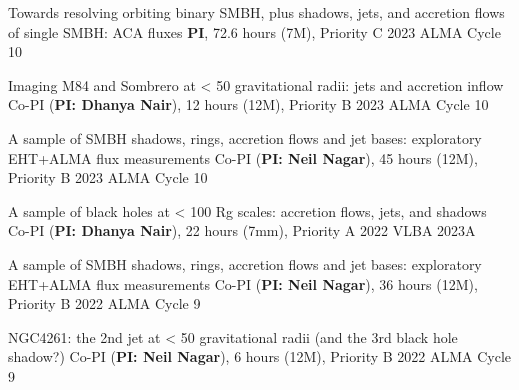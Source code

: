 
\begin{cvpublications}{}
\iffalse
	 \cvpublication{11}
	 {Towards resolving binary SMBH, and jets+accretion flows
in single SMBH: exploratory EHT+ALMA flux measurements}
	 {Co-PI (\textbf{PI: Neil Nagar}), Submitted}
	 {2024}
     {ALMA Cycle 11}
     {}

	 \cvpublication{10}
	 {Towards resolving orbiting binary SMBH, plus shadows, jets, and accretion flows of single SMBH}
	 {Co-PI (\textbf{PI: Neil Nagar}), Submitted}
	 {2024}
     {ALMA Cycle 11}
     {}

	 \cvpublication{9}
	 {Imaging M84 at < 50 gravitational radii: jets and accretion inflow (Resubmission)}
	 {Co-PI (\textbf{PI: Neil Nagar}), Submitted}
	 {2024}
     {ALMA Cycle 11}
     {}

	 \cvpublication{8}
	 {Jet Launching and Black Hole Demographics: the `Gold Sample'}
	 {Co-PI (\textbf{PI: Neil Nagar}), Submitted}
	 {2024}
     {ALMA Cycle 11}
     {}

	 \cvpublication{7}
	 {Six black holes at < 50 Gravitational radii: jet and accretion inflow demographics}
	 {Co-PI (\textbf{PI: Neil Nagar}), Submitted}
	 {2024}
     {ALMA Cycle 11}
     {}
\fi

	 {Towards resolving orbiting binary SMBH, plus shadows, jets, and accretion flows of single SMBH: ACA fluxes}
	 {\textbf{PI}, 72.6 hours (7M), Priority C}
	 {2023}
     {ALMA Cycle 10}
     {}

	 {Imaging M84 and Sombrero at < 50 gravitational radii: jets and accretion inflow}
	 {Co-PI (\textbf{PI: Dhanya Nair}), 12 hours (12M), Priority B}
	 {2023}
     {ALMA Cycle 10}
     {}

	 {A sample of SMBH shadows, rings, accretion flows and jet bases: exploratory EHT+ALMA flux measurements}
	 {Co-PI (\textbf{PI: Neil Nagar}), 45 hours (12M), Priority B}
	 {2023}
     {ALMA Cycle 10}
     {}

	 {A sample of black holes at < 100 Rg scales: accretion flows, jets, and shadows}
	 {Co-PI (\textbf{PI: Dhanya Nair}), 22 hours (7mm), Priority A}
	 {2022}
     {VLBA 2023A}
     {}

	 {A sample of SMBH shadows, rings, accretion flows and jet bases: exploratory EHT+ALMA flux measurements}
	 {Co-PI (\textbf{PI: Neil Nagar}), 36 hours (12M), Priority B}
	 {2022}
     {ALMA Cycle 9}
     {}

	 {NGC4261: the 2nd jet at < 50 gravitational radii (and the 3rd black hole shadow?)}
	 {Co-PI (\textbf{PI: Neil Nagar}), 6 hours (12M), Priority B}
	 {2022}
     {ALMA Cycle 9}
     {}

\end{cvpublications}